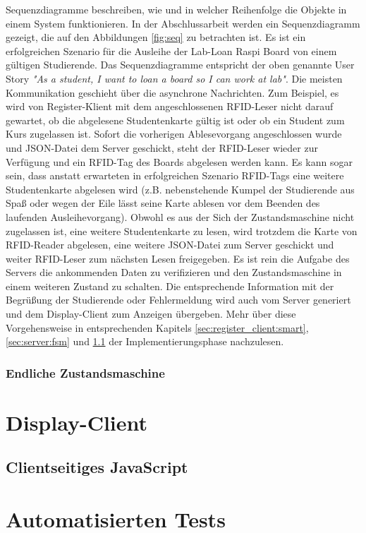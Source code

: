 Sequenzdiagramme beschreiben, wie und in welcher Reihenfolge die Objekte in einem System funktionieren. In der Abschlussarbeit werden ein Sequenzdiagramm gezeigt, die auf den Abbildungen \ref{fig:seq} zu betrachten ist. Es ist ein erfolgreichen Szenario für die Ausleihe der Lab-Loan Raspi Board von einem gültigen Studierende. Das Sequenzdiagramme entspricht der oben genannte User Story \textit{"As a student, I want to loan a board so I can work at lab"}. Die meisten Kommunikation geschieht über die asynchrone Nachrichten. Zum Beispiel, es wird von Register-Klient mit dem angeschlossenen RFID-Leser nicht darauf gewartet, ob die abgelesene Studentenkarte gültig ist oder ob ein Student zum Kurs zugelassen ist. Sofort die vorherigen Ablesevorgang angeschlossen wurde und JSON-Datei dem Server geschickt, steht der RFID-Leser wieder zur Verfügung und ein RFID-Tag des Boards abgelesen werden kann. Es kann sogar sein, dass anstatt erwarteten in erfolgreichen Szenario RFID-Tags eine weitere Studentenkarte abgelesen wird (z.B. nebenstehende Kumpel der Studierende aus Spaß oder wegen der Eile lässt seine Karte ablesen vor dem Beenden des laufenden Ausleihevorgang). Obwohl es aus der Sich der Zustandsmaschine nicht zugelassen ist, eine weitere Studentenkarte zu lesen, wird trotzdem die Karte von RFID-Reader abgelesen, eine weitere JSON-Datei zum Server geschickt und weiter RFID-Leser zum nächsten Lesen freigegeben. Es ist rein die Aufgabe des Servers die ankommenden Daten zu verifizieren und den Zustandsmaschine in einem weiteren Zustand zu schalten. Die entsprechende Information mit der Begrüßung der Studierende oder Fehlermeldung wird auch vom Server generiert und dem Display-Client zum Anzeigen übergeben. Mehr über diese Vorgehensweise in entsprechenden Kapitels \ref{sec:register_client:smart}, \ref{sec:server:fsm} und \ref*{sec:display_client:js} der Implementierungsphase nachzulesen. 

\subsubsection{Endliche Zustandsmaschine}
\label{sec:server:fsm:fsm}


\section{Display-Client}
\label{sec:display_client}

\subsection{Clientseitiges JavaScript}
\label{sec:display_client:js}


\section{Automatisierten Tests}
\label{sec:testing}
